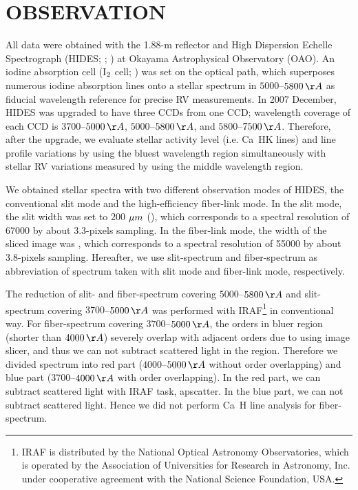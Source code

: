 \documentclass[]{pasj01}
\begin{document}
\section{OBSERVATION}
All data were obtained with the 1.88-m reflector and High Dispersion Echelle Spectrograph (HIDES; \cite{Izumiura1999}; \cite{Kambe2013}) at Okayama Astrophysical Observatory (OAO).
An iodine absorption cell (I$_{\rm 2}$ cell; \cite{Kambe2002}) was set on the optical path, which superposes numerous iodine absorption lines onto a stellar spectrum in $5000$--$5800\,{\rm \AA}$ as fiducial wavelength reference for precise RV measurements.
In 2007 December, HIDES was upgraded to have three CCDs from one CCD; wavelength coverage of each CCD is $3700$--$5000\,{\rm \AA}$, $5000$--$5800\,{\rm \AA}$, and $5800$--$7500\,{\rm \AA}$.
Therefore, after the upgrade, we evaluate stellar activity level (i.e. Ca\, HK lines) and line profile variations by using the bluest wavelength region simultaneously with stellar RV variations measured by using the middle wavelength region. 

We obtained stellar spectra with two different observation modes of HIDES, the conventional slit mode and the high-efficiency fiber-link mode.
In the slit mode, the slit width was set to $200$ $\micron$ (), which corresponds to a spectral resolution of 67000 by about 3.3-pixels sampling.
In the fiber-link mode, the width of the sliced image was , which corresponds to a spectral resolution of 55000 by about 3.8-pixels sampling.
Hereafter, we use slit-spectrum and fiber-spectrum as abbreviation of spectrum taken with slit mode and fiber-link mode, respectively.

The reduction of slit- and fiber-spectrum covering $5000$--$5800\,{\rm \AA}$ and slit-spectrum covering $3700$--$5000\,{\rm \AA}$ was performed with IRAF\footnote{IRAF is distributed by the National Optical Astronomy Observatories, which is operated by the Association of Universities for Research in Astronomy, Inc. under cooperative agreement with the National Science Foundation, USA.} in conventional way.
For fiber-spectrum covering $3700$--$5000\,{\rm \AA}$, the orders in bluer region (shorter than $4000\,{\rm \AA}$) severely overlap with adjacent orders due to using image slicer, and thus we can not subtract scattered light in the region.
Therefore we divided spectrum into red part ($4000$--$5000\,{\rm \AA}$ without order overlapping) and blue part ($3700$--$4000\,{\rm \AA}$ with order overlapping).
In the red part, we can subtract scattered light with IRAF task, apscatter.
In the blue part, we can not subtract scattered light.
Hence we did not perform Ca\, H line analysis for fiber-spectrum.\\
\end{document}
